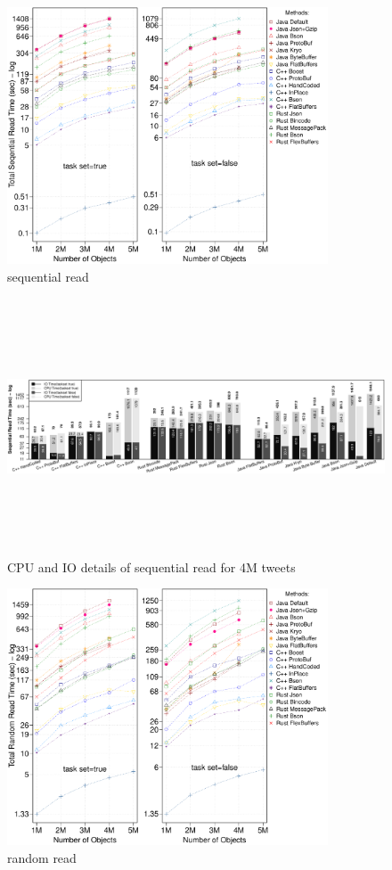 \begin{figure}
	\centering
	\includegraphics[width=\columnwidth,height=3in,keepaspectratio]{../../RScripts/Experiment_Seq_Read_CPU_Plot.pdf}
	\caption{sequential read}
	\label{fig:seq_read}
\end{figure}
\begin{figure}
	\centering
	\includegraphics[width=\linewidth,height=3in,keepaspectratio]{../../RScripts/Experiment_Seq_Read_CPU_IO_Bar.pdf}
	\caption{CPU and IO details of sequential read for 4M tweets}
	\label{fig:seq_read_detail}
\end{figure}

\begin{figure}
	\centering
	\includegraphics[width=\columnwidth,height=3in,keepaspectratio]{../../RScripts/Experiment_Rand_Read_CPU_Plot.pdf}
	\caption{random read}
	\label{fig:rand_read}
\end{figure}

